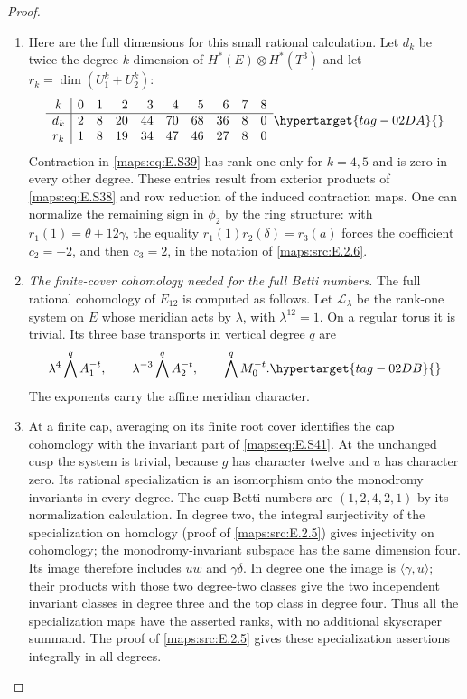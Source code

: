 \documentclass[11pt,a4paper]{article}
\numberwithin{equation}{section}
\theoremstyle{definition}
\begin{document}
\begin{proof}
\begin{enumerate}[label=\arabic*.,leftmargin=*]
\item Here are the full dimensions for this small rational
calculation. Let $d_k$ be twice the degree-$k$ dimension
of $H^*(E)\otimes H^*(T^3)$ and let
$r_k=\dim(U_1^k+U_2^k)$:
\begin{equation}
 \begin{array}{c|rrrrrrrrr}
 k&0&1&2&3&4&5&6&7&8\\ \hline
 d_k&2&8&20&44&70&68&36&8&0\\
 r_k&1&8&19&34&47&46&27&8&0
 \end{array}
 \hypertarget{tag-02DA}{}\label{maps:eq:E.S40}
\end{equation}
Contraction in \eqref{maps:eq:E.S39} has rank one only for
$k=4,5$ and is zero in every other degree. These entries result from exterior products of \eqref{maps:eq:E.S38}
and row reduction of the induced contraction maps. One can normalize the remaining sign in
$\phi_2$ by the ring structure: with
$r_1(1)=\theta+12\gamma$, the equality
$r_1(1)r_2(\delta)=r_3(a)$ forces the coefficient
$c_2=-2$, and then $c_3=2$, in the notation of \ref{maps:src:E.2.6}.



\item \emph{The finite-cover cohomology needed for the full Betti numbers.}
The full rational cohomology of $E_{12}$ is computed as follows.
Let $\mathcal L_\lambda$ be the rank-one system on $E$
whose meridian acts by $\lambda$, with $\lambda^{12}=1$.
On a regular torus it is trivial. Its three base transports
in vertical degree $q$ are
\begin{equation}
 \lambda^4\bigwedge^q A_1^{-t},\qquad
 \lambda^{-3}\bigwedge^q A_2^{-t},\qquad
                         \bigwedge^q M_0^{-t}.
 \hypertarget{tag-02DB}{}\label{maps:eq:E.S41}
\end{equation}
The exponents carry the affine meridian character.

\item At a finite cap, averaging on its finite root cover
identifies the cap cohomology with the invariant part of
\eqref{maps:eq:E.S41}. At the unchanged cusp the system is trivial,
because $g$ has character twelve and $u$ has character zero.
Its rational specialization is an isomorphism onto the
monodromy invariants in every degree.  The cusp Betti numbers are
$(1,2,4,2,1)$ by its normalization calculation. In degree
two, the integral surjectivity of the specialization on homology (proof of \cref{maps:src:E.2.5}) gives injectivity on cohomology;
the monodromy-invariant subspace has the same dimension
four. Its image therefore includes $uw$ and $\gamma\delta$.
In degree one the image is $\langle\gamma,u\rangle$;
their products with those two degree-two classes give the
two independent invariant classes in degree three and
the top class in degree four. Thus all the specialization
maps have the asserted ranks, with no additional
skyscraper summand. The proof of \cref{maps:src:E.2.5} gives these specialization assertions integrally in all degrees.


\end{enumerate}
\end{proof}
\end{document}
